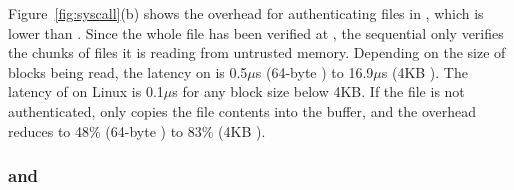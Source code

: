 Figure~\ref{fig:syscall}(b)
shows the overhead for authenticating files in , which 
is lower than .
Since the whole file has been verified at , the sequential  only verifies the chunks of files it is reading from untrusted memory.
Depending on the size of blocks being read, the latency on \graphenesgx{} is 0.5$\mu$s (64-byte ) to 16.9$\mu$s (4KB ). The latency of  on Linux is \roughly{}0.1$\mu$s for any block size below 4KB.
If the file is not authenticated,
\graphenesgx{} only copies the file contents into the buffer, and the overhead reduces to 48\% (64-byte ) to 83\% (4KB ).



\subsubsection{ and }


